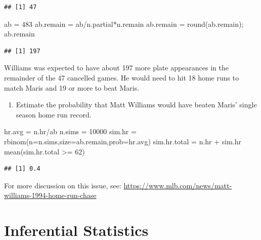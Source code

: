 \documentclass[
  11pt,
]{book}
\newenvironment{Shaded}{\begin{snugshade}}{\end{snugshade}}
\newcommand{\AttributeTok}[1]{\textcolor[rgb]{0.77,0.63,0.00}{#1}}
\newcommand{\DecValTok}[1]{\textcolor[rgb]{0.00,0.00,0.81}{#1}}
\newcommand{\FunctionTok}[1]{\textcolor[rgb]{0.00,0.00,0.00}{#1}}
\newcommand{\NormalTok}[1]{#1}
\newcommand{\OtherTok}[1]{\textcolor[rgb]{0.56,0.35,0.01}{#1}}
\newcommand{\SpecialCharTok}[1]{\textcolor[rgb]{0.00,0.00,0.00}{#1}}
\providecommand{\tightlist}{%
  \setlength{\itemsep}{0pt}\setlength{\parskip}{0pt}}
\theoremstyle{definition}
\theoremstyle{definition}
\theoremstyle{definition}
\theoremstyle{definition}
\theoremstyle{remark}
\begin{document}
\begin{verbatim}
## [1] 47
\end{verbatim}

\begin{Shaded}
\begin{Highlighting}[]
\NormalTok{ab }\OtherTok{=} \DecValTok{483}
\NormalTok{ab.remain }\OtherTok{=}\NormalTok{ ab}\SpecialCharTok{/}\NormalTok{n.partial}\SpecialCharTok{*}\NormalTok{n.remain}
\NormalTok{ab.remain }\OtherTok{=} \FunctionTok{round}\NormalTok{(ab.remain); ab.remain}
\end{Highlighting}
\end{Shaded}

\begin{verbatim}
## [1] 197
\end{verbatim}

Williams was expected to have about 197 more plate appearances in the remainder of the 47 cancelled games. He would need to hit 18 home runs to match Maris and 19 or more to beat Maris.

\begin{enumerate}
\def\labelenumi{(\alph{enumi})}
\setcounter{enumi}{1}
\tightlist
\item
  Estimate the probability that Matt Williams would have beaten Maris' single season home run record.
\end{enumerate}

\begin{Shaded}
\begin{Highlighting}[]
\NormalTok{hr.avg }\OtherTok{=}\NormalTok{ n.hr}\SpecialCharTok{/}\NormalTok{ab}
\NormalTok{n.sims }\OtherTok{=} \DecValTok{10000}
\NormalTok{sim.hr }\OtherTok{=} \FunctionTok{rbinom}\NormalTok{(}\AttributeTok{n=}\NormalTok{n.sims,}\AttributeTok{size=}\NormalTok{ab.remain,}\AttributeTok{prob=}\NormalTok{hr.avg)}
\NormalTok{sim.hr.total }\OtherTok{=}\NormalTok{ n.hr }\SpecialCharTok{+}\NormalTok{ sim.hr}
\FunctionTok{mean}\NormalTok{(sim.hr.total }\SpecialCharTok{\textgreater{}=} \DecValTok{62}\NormalTok{)}
\end{Highlighting}
\end{Shaded}

\begin{verbatim}
## [1] 0.4
\end{verbatim}

For more discussion on this issue, see: \url{https://www.mlb.com/news/matt-williams-1994-home-run-chase}

\hypertarget{inferential-statistics}{%
\chapter{Inferential Statistics}\label{inferential-statistics}}
\end{document}

